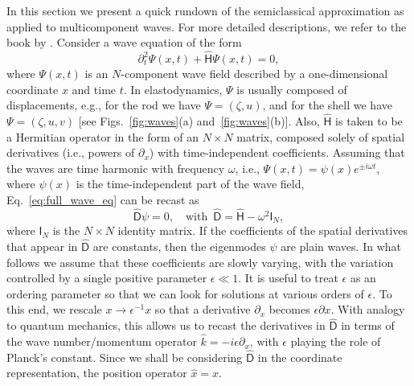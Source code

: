 In this section we present a quick rundown of the semiclassical approximation as applied to multicomponent waves.
For more detailed descriptions, we refer to the book by \citet{tracy2014}.
Consider a wave equation of the form
%
\begin{equation}
  \partial_{t}^{2}\Psi(x,t) + \widehat{\mathsf{H}}\Psi(x,t) = 0,
  \label{eq:full_wave_eq}
\end{equation}
%
where $\Psi(x,t)$ is an $N$-component wave field described by a one-dimensional coordinate $x$ and time $t$.
In elastodynamics, $\Psi$ is usually composed of displacements, e.g., for the rod we have $\Psi = (\zeta, u)$, and for the shell we have $\Psi = (\zeta, u, v)$ [see Figs.~\ref{fig:waves}(a) and~\ref{fig:waves}(b)].
Also, $\widehat{\mathsf{H}}$ is taken to be a Hermitian operator in the form of an $N\times N$ matrix, composed solely of spatial derivatives (i.e., powers of $\partial_{x}$) with time-independent coefficients.
Assuming that the waves are time harmonic with frequency $\omega$, i.e., $\Psi(x, t) = \psi(x)e^{\pm i\omega t}$, where $\psi(x)$ is the time-independent part of the wave field, Eq.~\eqref{eq:full_wave_eq} can be recast as
%
\begin{equation}
  \widehat{\mathsf{D}}\psi = 0,\quad \text{with}\enspace \widehat{\mathsf{D}} = \widehat{\mathsf{H}} - \omega^{2}\mathsf{I}_{N},
  \label{eq:ev_problem}
\end{equation}
%
where $\mathsf{I}_{N}$ is the $N\times N$ identity matrix.
If the coefficients of the spatial derivatives that appear in $\widehat{\mathsf{D}}$ are constants, then the eigenmodes $\psi$ are plain waves.
In what follows we assume that these coefficients are slowly varying, with the variation controlled by a single positive parameter $\epsilon \ll 1$.
It is useful to treat $\epsilon$ as an ordering parameter so that we can look for solutions at various orders of $\epsilon$.
To this end, we rescale $x \to \epsilon^{-1}x$ so that a derivative $\partial_{x}$ becomes $\epsilon \partial x$.
With analogy to quantum mechanics, this allows us to recast the derivatives in $\widehat{\mathsf{D}}$ in terms of the wave number/momentum operator $\hat{k} = -i\epsilon \partial_{x}$, with $\epsilon$ playing the role of Planck's constant.
Since we shall be considering $\widehat{\mathsf{D}}$ in the coordinate representation, the position operator $\hat{x} = x$.

